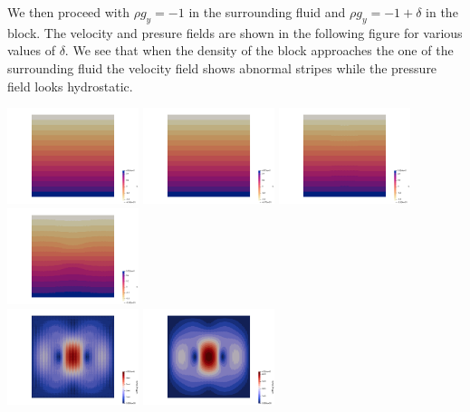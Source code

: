 We then proceed with $\rho g_y=-1$ in the surrounding fluid and $\rho g_y=-1+\delta$ in the block.
The velocity and presure fields are shown in the following figure for various values of $\delta$.
We see that when the density of the block approaches the one of the surrounding fluid the 
velocity field shows abnormal stripes while the pressure field looks hydrostatic.   

\begin{center}
\includegraphics[width=3.84cm]{python_codes/fieldstone_78/results/block/p_delta0p001}
\includegraphics[width=3.84cm]{python_codes/fieldstone_78/results/block/p_delta0p01}
\includegraphics[width=3.84cm]{python_codes/fieldstone_78/results/block/p_delta0p1}
\includegraphics[width=3.84cm]{python_codes/fieldstone_78/results/block/p_delta1}\\
\includegraphics[width=3.84cm]{python_codes/fieldstone_78/results/block/vel_delta0p001}
\includegraphics[width=3.84cm]{python_codes/fieldstone_78/results/block/vel_delta0p01}

\end{center}
